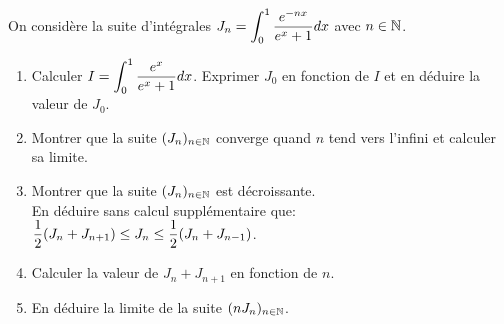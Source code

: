 \documentclass[a4paper, 11pt,reqno]{article}
\begin{document}
\begin{exercice}  \;
	On consid\`ere la suite d'int\'egrales $J_n=\displaystyle \int_0^1 \displaystyle\frac{e^{-nx}}{e^x+1} dx$ avec $n\in\mathbb{N}$.
	\begin{enumerate}
		\item Calculer $I=\displaystyle \int_0^1 \displaystyle\frac{e^x}{e^x+1}dx$. Exprimer $J_0$ en fonction de $I$ et en d\'eduire la valeur
		      de $J_0$.
		\item Montrer que la suite $(J_n)_{n\in\mathbb{N}}$ converge quand $n$ tend vers l'infini et calculer sa limite.
		\item Montrer que la suite $(J_n)_{n\in\mathbb{N}}$ est d\'ecroissante. \\
		      \noindent En d\'eduire sans calcul suppl\'ementaire que: $\displaystyle\frac{1}{2} (J_n+J_{n+1})  \leq J_n\leq \displaystyle\frac{1}{2} (J_n+J_{n-1})$.
		\item Calculer la valeur de $J_n+J_{n+1}$ en fonction de $n$.
		\item En d\'eduire la limite de la suite $(nJ_n)_{n\in\mathbb{N}}$.%
	\end{enumerate}
\end{exercice}
\end{document}
